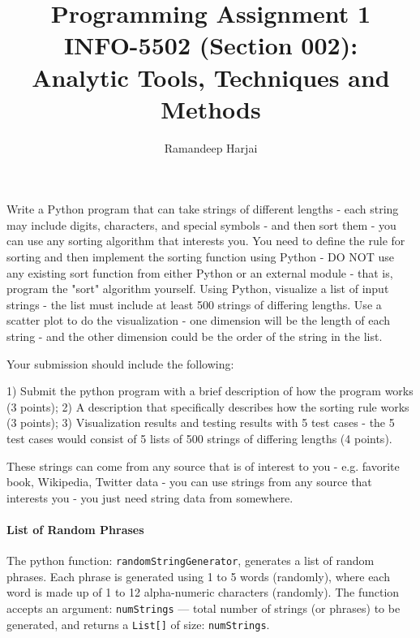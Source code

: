 \documentclass[UTF8, letter]{article}
\title{Programming Assignment 1 \\
\large INFO-5502 (Section 002): \\
Analytic Tools, Techniques and Methods }
\author{Ramandeep Harjai}
\begin{document}
\maketitle

\doublespacing
\setlength{\parskip}{\baselineskip}
\setlength{\parindent}{4em}

Write a Python program that can take strings of different lengths - each string may include digits, characters, and special symbols - and then sort them - you can use any sorting algorithm that interests you.  You need to define the rule for sorting and then implement the sorting function using Python - DO NOT use any existing sort function from either Python or an external module - that is, program the "sort" algorithm yourself.  Using Python, visualize a list of input strings - the list must include at least 500 strings of differing lengths.   Use a scatter plot to do the visualization - one dimension will be the length of each string - and the other dimension could be the order of the string in the list.

Your submission should include the following:

1) Submit the python program with a brief description of how the program works (3 points);  2)  A description that specifically describes how the sorting rule works (3 points);  3)  Visualization results and testing results with 5 test cases -  the 5 test cases would consist of 5 lists of 500 strings of differing lengths (4 points).

These strings can come from any source that is of interest to you -  e.g. favorite book,   Wikipedia,  Twitter data - you can use strings from any source that interests you - you just need string data from somewhere.

\pagebreak
\paragraph{List of Random Phrases}
The python function: \texttt{randomStringGenerator}, generates a list of random phrases. Each phrase is generated using 1 to 5 words (randomly), where each word is made up of 1 to 12 alpha-numeric characters (randomly). The function accepts an argument: \texttt{numStrings} --- total number of strings (or phrases) to be generated, and returns a \texttt{List[]} of size: \texttt{numStrings}.
\end{document}
